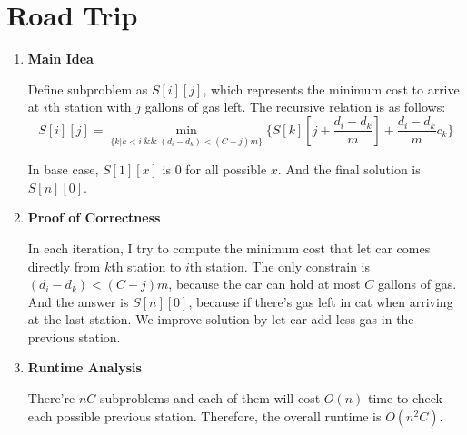 \documentclass[11pt]{article}
\newenvironment{qparts}{\begin{enumerate}[{(}a{)}]}{\end{enumerate}}
\begin{document}
\newpage
\section{Road Trip}
\begin{qparts}
	\item \textbf{Main Idea}
	
	Define subproblem as $S[i][j]$, which represents the minimum cost to arrive at $i$th station with $j$ gallons of gas left.
	The recursive relation is as follows:
	\[
		S[i][j] = \min_{\{ k | k < i \  \&\& \  (d_i - d_k) < (C - j)m \}} \{ S[k][j + \frac{d_i - d_k}{m}] + \frac{d_i - d_k}{m} c_k \}
	\]
	
	In base case, $S[1][x]$ is 0 for all possible $x$. And the final solution is $S[n][0]$.

	\item \textbf{Proof of Correctness}
	
	In each iteration, I try to compute the minimum cost that let car comes directly from $k$th station to $i$th station. The only constrain is $(d_i - d_k) < (C - j)m$, because the car can hold at most $C$ gallons of gas. And the answer is $S[n][0]$, because if there's gas left in cat when arriving at the last station. We improve solution by let car add less gas in the previous station.
	
	\item \textbf{Runtime Analysis}
	
	There're $nC$ subproblems and each of them will cost $O(n)$ time to check each possible previous station. Therefore, the overall runtime is $O(n^2C)$.
	

\end{qparts}

\newpage
\end{document}
